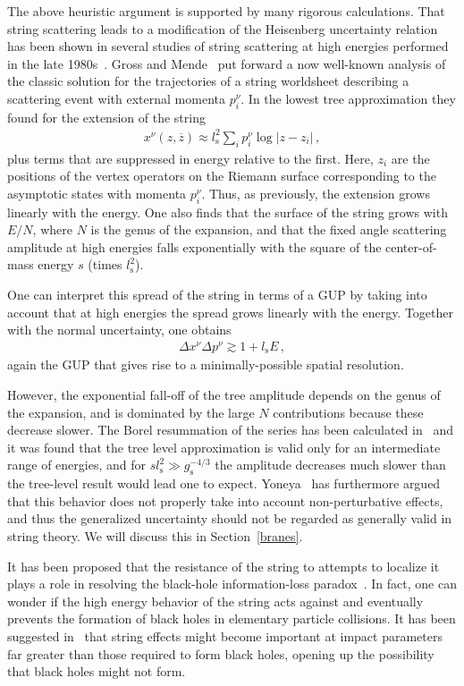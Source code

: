 \documentclass{article}
\def\beqn{\begin{eqnarray}}
\def\eeqn{\end{eqnarray}}
\begin{document}
The above heuristic argument is supported by many rigorous calculations. 
That string scattering leads to a modification of the Heisenberg uncertainty relation has been shown in
several studies of string scattering at high energies performed in the late 1980s~\cite{Gross:1987ar,Veneziano:1989fc,Mende:1989wt}. 
Gross and Mende~\cite{Gross:1987ar} put forward a now well-known analysis of 
the classic solution for the trajectories of a string worldsheet describing a scattering 
event with external momenta $p_i^\nu$. 
In the lowest tree approximation they found for the extension of the string
\beqn
x^\nu(z,\overline z) \approx l_{\mathrm{s}}^2 \sum_i p_i^\nu \log |z - z_i | \,,
\eeqn
plus terms that are suppressed in energy relative to the first. Here, $z_i$ are the positions of the vertex operators on the 
Riemann surface corresponding to the asymptotic states with momenta $p_i^\nu$. Thus, as previously,  
the extension grows linearly with the energy. One also finds that the surface of the string grows with $E/N$, where $N$ is the genus of 
the expansion, and that the fixed angle scattering amplitude at high energies falls exponentially
with the square of the center-of-mass energy $s$ (times $l_{\mathrm{s}}^2$). 

One can interpret this spread of the string in terms of a GUP by
taking into account that at high energies the spread grows linearly with the energy. Together with the normal
uncertainty, one obtains
\beqn
\Delta x^\nu \Delta p^\nu \gtrsim 1 + l_{\mathrm{s}} E \,,
\eeqn
again the GUP that gives rise to a minimally-possible spatial resolution.

However, the exponential fall-off of the tree amplitude depends on the genus of the expansion, and is
dominated by the large $N$ contributions because these decrease slower. The Borel resummation of the
series has been calculated in~\cite{Mende:1989wt} and it was found that the tree level approximation
is valid only for an intermediate range of energies, and for $s l_{\mathrm{s}}^2 \gg g_{\mathrm{s}}^{-4/3}$ the
amplitude decreases much slower than the tree-level result would lead one to expect. 
Yoneya~\cite{Yoneya:2000bt} has furthermore argued that this
behavior does not properly take into account non-perturbative effects, and thus the generalized
uncertainty should not be regarded as generally valid in string theory. We will discuss this in Section~\ref{branes}.


It has been proposed that the resistance of the string to attempts to localize it plays a role in resolving
the black-hole information-loss paradox~\cite{Lowe:1995ac}. In fact, one can wonder if the high energy
behavior of the string acts against and eventually prevents the formation of black holes in elementary
particle collisions. It has been suggested in~\cite{Amati:1987uf,Amati:1987wq,Amati:1990xe} that string effects might become important at impact
parameters far greater than those required to form black holes, opening up the possibility that black holes might not
form. 
\end{document}
